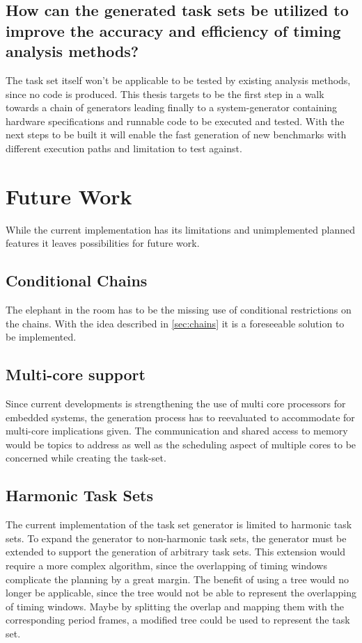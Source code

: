 \subsection{How can the generated task sets be utilized to improve the accuracy and efficiency of timing analysis methods?}\label{subsec:summary:Q4}
The task set itself won't be applicable to be tested by existing analysis methods, since no code is produced.
This thesis targets to be the first step in a walk towards a chain of generators leading finally to a system-generator containing hardware specifications and runnable code to be executed and tested.
With the next steps to be built it will enable the fast generation of new benchmarks with different execution paths and limitation to test against.

\section{Future Work}\label{sec:future_work}
While the current implementation has its limitations and unimplemented planned features it leaves possibilities for future work.

\subsection{Conditional Chains}\label{subsec:future_work:conditional_chains}
The elephant in the room has to be the missing use of conditional restrictions on the chains.
With the idea described in \cref{sec:chains} it is a foreseeable solution to be implemented.

\subsection{Multi-core support}\label{subsec:future_work:multicore}
Since current developments is strengthening the use of multi core processors for embedded systems, the generation process has to reevaluated to accommodate for multi-core implications given.
The communication and shared access to memory would be topics to address as well as the scheduling aspect of multiple cores to be concerned while creating the task-set.

\subsection{Harmonic Task Sets}\label{subsec:future_work:harmonic_task_sets}
The current implementation of the task set generator is limited to harmonic task sets.
To expand the generator to non-harmonic task sets, the generator must be extended to support the generation of arbitrary task sets.
This extension would require a more complex algorithm, since the overlapping of timing windows complicate the planning by a great margin.
The benefit of using a tree would no longer be applicable, since the tree would not be able to represent the overlapping of timing windows.
Maybe by splitting the overlap and mapping them with the corresponding period frames, a modified tree could be used to represent the task set.


